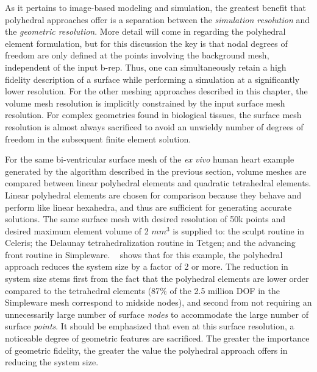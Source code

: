As it pertains to image-based modeling and simulation, the greatest benefit that polyhedral approaches offer is a separation between the \textit{simulation resolution} and the \textit{geometric resolution}. More detail will come in  regarding the polyhedral element formulation, but for this discussion the key is that nodal degrees of freedom are only defined at the points involving the background mesh, independent of the input b-rep. Thus, one can simultaneously retain a high fidelity description of a surface while performing a simulation at a significantly lower resolution. For the other meshing approaches described in this chapter, the volume mesh resolution is implicitly constrained by the input surface mesh resolution. For complex geometries found in biological tissues, the surface mesh resolution is almost always sacrificed to avoid an unwieldy number of degrees of freedom in the subsequent finite element solution.

For the same bi-ventricular surface mesh of the \textit{ex vivo} human heart example generated by the algorithm described in the previous section, volume meshes are compared between linear polyhedral elements and quadratic tetrahedral elements. Linear polyhedral elements are chosen for comparison because they behave and perform like linear hexahedra, and thus are sufficient for generating accurate solutions. The same surface mesh with desired resolution of 50k points and desired maximum element volume of 2 $mm^3$ is supplied to: the sculpt routine in Celeris; the Delaunay tetrahedralization routine in Tetgen; and the advancing front routine in Simpleware. ~ shows that for this example, the polyhedral approach reduces the system size by a factor of 2 or more. The reduction in system size stems first from the fact that the polyhedral elements are lower order compared to the tetrahedral elements (87$\%$ of the 2.5 million DOF in the Simpleware mesh correspond to midside nodes), and second from not requiring an unnecessarily large number of surface \textit{nodes} to accommodate the large number of surface \textit{points}. It should be emphasized that even at this surface resolution, a noticeable degree of geometric features are sacrificed. The greater the importance of geometric fidelity, the greater the value the polyhedral approach offers in reducing the system size.

